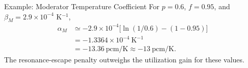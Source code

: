 \documentclass[compact]{ne630handout}
\begin{document}
\vspace{6pt}

\begin{KeyBox}{Example: Moderator Temperature Coefficient}
For $p=0.6$, $f=0.95$, and $\beta_M=2.9\times10^{-4}$ K$^{-1}$,
\begin{align*}
 \alpha_M&\simeq-2.9\times10^{-4}
 \big[\ln(1/0.6)-(1-0.95)\big]\\
 &=-1.3364\times10^{-4}\ \mathrm{K}^{-1}\\
 &=-13.36\ \mathrm{pcm/K}\approx\boxed{-13\ \mathrm{pcm/K}}.
\end{align*}
The resonance-escape penalty outweighs the utilization gain for these values.
\end{KeyBox}



\colend
\end{document}
